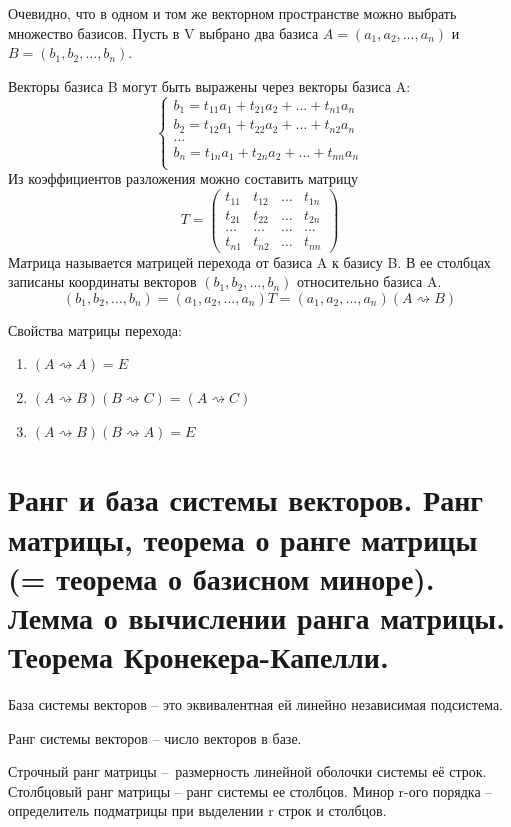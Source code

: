 \documentclass{article}
\begin{document}
Очевидно, что в одном и том же векторном пространстве можно выбрать множество базисов. Пусть в V выбрано два базиса $A=(a_1,a_2,\dots,a_n)$ и $B=(b_1,b_2,\dots,b_n)$.

Векторы базиса B могут быть выражены через векторы базиса A:
\begin{equation*}
    \begin{cases}
        b_1=t_{11}a_1+t_{21}a_2+\dots+t_{n1}a_n \\
        b_2=t_{12}a_1+t_{22}a_2+\dots+t_{n2}a_n \\
        \dots \\
        b_n=t_{1n}a_1+t_{2n}a_2+\dots+t_{nn}a_n \\
    \end{cases}
\end{equation*}
Из коэффициентов разложения можно составить матрицу $$T=
\begin{pmatrix}
    t_{11} & t_{12} & \dots & t_{1n} \\
    t_{21} & t_{22} & \dots & t_{2n} \\
    \dots & \dots & \dots & \dots \\
    t_{n1} & t_{n2} & \dots & t_{nn}
\end{pmatrix}
$$
Матрица называется \textsf{матрицей перехода} от базиса A к базису B. В ее столбцах записаны координаты векторов $(b_1,b_2,\dots,b_n)$ относительно базиса A.
$$(b_1,b_2,\dots,b_n)=(a_1,a_2,\dots,a_n)T=(a_1,a_2,\dots,a_n)(A\rightsquigarrow B)$$

Свойства матрицы перехода:
\begin{enumerate}
    \item $(A\rightsquigarrow A)=E$
    \item $(A\rightsquigarrow B)(B\rightsquigarrow C)=(A\rightsquigarrow C)$
    \item $(A\rightsquigarrow B)(B\rightsquigarrow A)=E$
\end{enumerate}

\section{Ранг и база системы векторов. Ранг матрицы, теорема о ранге матрицы (= теорема о базисном миноре). Лемма о вычислении ранга матрицы. Теорема Кронекера-Капелли.}
База системы векторов – это эквивалентная ей линейно независимая подсистема.

Ранг системы векторов – число векторов в базе.

Строчный ранг матрицы – размерность линейной оболочки системы её строк. Столбцовый ранг матрицы – ранг системы ее столбцов. Минор r-ого порядка – определитель подматрицы при выделении r строк и столбцов.
\end{document}
